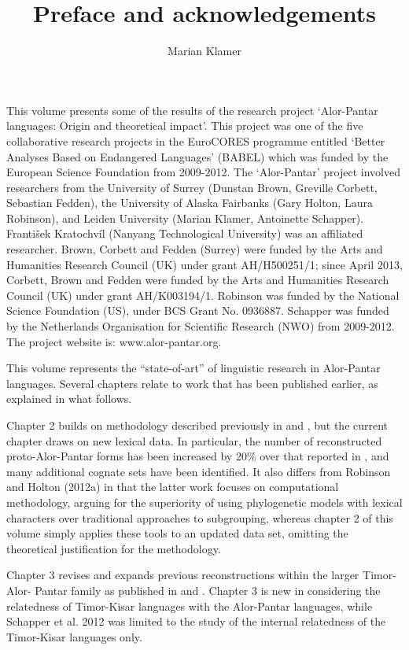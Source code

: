 \documentclass[output=paper]{LSP/langsci}
\author{Marian Klamer}
\title{Preface and acknowledgements}
\begin{document}
This volume presents some of the results of the research project `Alor-Pantar languages: Origin and theoretical impact'. This project was one of the five collaborative research projects in the EuroCORES programme entitled `Better Analyses Based on Endangered Languages' (BABEL) which was funded by the European Science Foundation from 2009-2012. The `Alor-Pantar' project involved researchers from the University of Surrey (Dunstan Brown, Greville Corbett, Sebastian Fedden), the University of Alaska Fairbanks (Gary Holton, Laura Robinson), and Leiden University (Marian Klamer, Antoinette Schapper). František Kratochvíl (Nanyang Technological University) was an affiliated researcher. Brown, Corbett and Fedden (Surrey) were funded by the Arts and Humanities Research Council (UK) under grant AH/H500251/1; since April 2013,  Corbett, Brown and Fedden were funded by the Arts and Humanities Research Council (UK) under grant AH/K003194/1. Robinson was funded by the National Science Foundation (US), under BCS Grant No. 0936887. Schapper was funded by the Netherlands Organisation for Scientific Research (NWO) from 2009-2012. The project website is: www.alor-pantar.org.  
	
	This volume represents the ``state-of-art'' of linguistic research in Alor-Pantar languages. Several chapters relate to work that has been published earlier, as explained in what follows. 
	
	Chapter 2 builds on methodology described previously in \citet{HoltonEtAl2012} and \citet{RobinsonEtAl2012internal}, but the current chapter draws on new lexical data. In particular, the number of reconstructed proto-Alor-Pantar forms has been increased by 20\% over that reported in \citet{HoltonEtAl2012}, and many additional cognate sets have been identified. It also differs from Robinson and Holton (2012a) in that the latter work focuses on computational methodology, arguing for the superiority of using phylogenetic models with lexical characters over traditional approaches to subgrouping, whereas chapter 2 of this volume simply applies these tools to an updated data set, omitting the theoretical justification for the methodology. 
	
	Chapter 3 revises and expands previous reconstructions within the larger Timor-Alor- Pantar family as published in \citet{HoltonEtAl2012} and \citet{SchapperEtAl2012}. Chapter 3 is new in considering the relatedness of Timor-Kisar languages with the Alor-Pantar languages, while Schapper et al. 2012 was limited to the study of the internal relatedness of the Timor-Kisar languages only.
	
\end{document}
